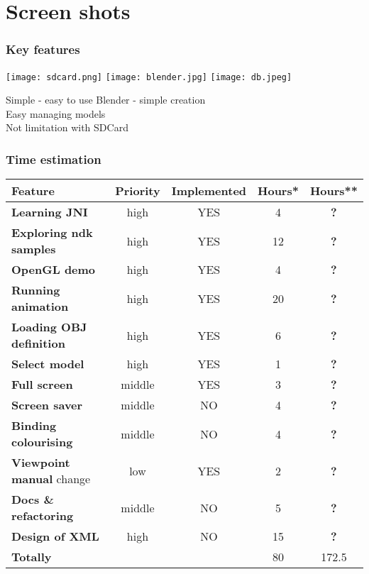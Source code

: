 \section{Screen shots} %
\label{sec:Screen shots}

\begin{frame}\frametitle{Key features} 
\texttt{[image: sdcard.png]}
\texttt{[image: blender.jpg]}
\texttt{[image: db.jpeg]}
  \begin{block}{Simple - easy to use}
   Blender - simple creation \\
   Easy managing models \\
   Not limitation with SDCard
  \end{block}
\end{frame}

\begin{frame}\frametitle{Time estimation} 
\begin{tabular}{| l || c | c |  c | c |}
\hline
Feature & Priority & Implemented & Hours* & Hours**\\
\hline
\hline
\textbf{Learning JNI} & high & YES &                 4 & {\bf ?} \\
\textbf{Exploring ndk samples} & high & YES &       12 &  {\bf ?} \\
\textbf{OpenGL demo} & high & YES &                  4 & {\bf ?} \\
\textbf{Running animation} & high & YES &           20 & {\bf ?} \\
\textbf{Loading OBJ definition} & high & YES &       6 &  {\bf ?} \\
\textbf{Select model} & high & YES &                 1 & {\bf ?} \\
\textbf{Full screen} & middle & YES &                3 &  {\bf ?} \\
\textbf{Screen saver} & middle & NO &                4 & {\bf ?} \\
\textbf{Binding colourising} & middle & NO &         4 & {\bf ?} \\
\textbf{Viewpoint manual} change & low & YES &       2 & {\bf ?} \\
\textbf{Docs \& refactoring} & middle & NO &         5 & {\bf ?} \\
\textbf{Design of XML} & high & NO &                15 & {\bf ?} \\
\hline
\textbf{Totally} &  & &                               80 & 172.5 \\
\hline
\end{tabular}
\end{frame}

